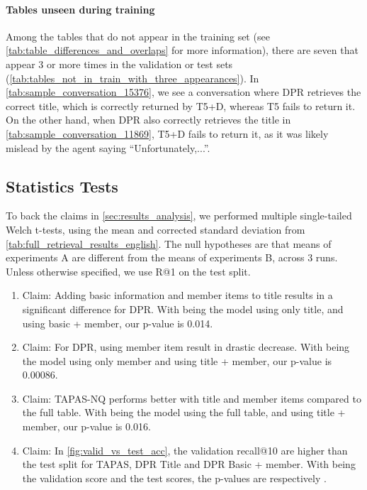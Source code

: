 \documentclass[11pt]{article}
\begin{document}
\paragraph{Tables unseen during training} Among the tables that do not appear in the training set (see \autoref{tab:table_differences_and_overlaps} for more information), there are seven that appear 3 or more times in the validation or test sets (\autoref{tab:tables_not_in_train_with_three_appearances}). In \autoref{tab:sample_conversation_15376}, we see a conversation where DPR retrieves the correct title, which is correctly returned by T5+D, whereas T5 fails to return it. On the other hand, when DPR also correctly retrieves the title in \autoref{tab:sample_conversation_11869}, T5+D fails to return it, as it was likely mislead by the agent saying ``Unfortunately,...''.

\subsection{Statistics Tests}
\label{sec:appendix_stats_tests}

To back the claims in \autoref{sec:results_analysis}, we performed multiple single-tailed Welch t-tests, using the mean and corrected standard deviation from \ref{tab:full_retrieval_results_english}. The null hypotheses are that means of experiments A are different from the means of experiments B, across 3 runs. Unless otherwise specified, we use R@1 on the test split.

\begin{enumerate}
    \item Claim: Adding basic information and member items to title results in a significant difference for DPR. With  being the model using only title, and  using basic + member, our p-value is 0.014.
    \item Claim: For DPR, using member item result in drastic decrease. With  being the model using only member and  using title + member, our p-value is 0.00086.
    \item Claim: TAPAS-NQ performs better with title and member items compared to the full table. With  being the model using the full table, and  using title + member, our p-value is 0.016.
    \item Claim: In \autoref{fig:valid_vs_test_acc}, the validation recall@10 are higher than the test split for TAPAS, DPR Title and DPR Basic + member. With  being the validation score and  the test scores, the p-values are respectively .
\end{enumerate}
\end{document}
